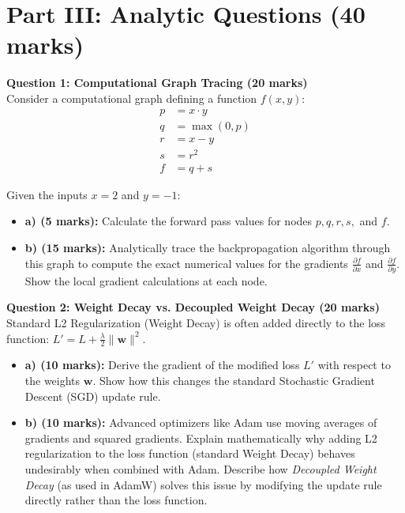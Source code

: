 \documentclass[11pt]{article}
\begin{document}
\vspace{1cm}

\section*{Part III: Analytic Questions (40 marks)}

\textbf{Question 1: Computational Graph Tracing (20 marks)}\\
Consider a computational graph defining a function $f(x, y)$:
\begin{align*}
p &= x \cdot y \\
q &= \max(0, p) \\
r &= x - y \\
s &= r^2 \\
f &= q + s
\end{align*}

Given the inputs $x = 2$ and $y = -1$:
\begin{itemize}
    \item \textbf{a) (5 marks):} Calculate the forward pass values for nodes $p, q, r, s,$ and $f$.
    \item \textbf{b) (15 marks):} Analytically trace the backpropagation algorithm through this graph to compute the exact numerical values for the gradients $\frac{\partial f}{\partial x}$ and $\frac{\partial f}{\partial y}$. Show the local gradient calculations at each node.
\end{itemize}

\vspace{0.5cm}

\textbf{Question 2: Weight Decay vs. Decoupled Weight Decay (20 marks)}\\
Standard L2 Regularization (Weight Decay) is often added directly to the loss function: $L' = L + \frac{\lambda}{2} \|\mathbf{w}\|^2$. 

\begin{itemize}
    \item \textbf{a) (10 marks):} Derive the gradient of the modified loss $L'$ with respect to the weights $\mathbf{w}$. Show how this changes the standard Stochastic Gradient Descent (SGD) update rule.
    \item \textbf{b) (10 marks):} Advanced optimizers like Adam use moving averages of gradients and squared gradients. Explain mathematically why adding L2 regularization to the loss function (standard Weight Decay) behaves undesirably when combined with Adam. Describe how \textit{Decoupled Weight Decay} (as used in AdamW) solves this issue by modifying the update rule directly rather than the loss function.
\end{itemize}
\end{document}
